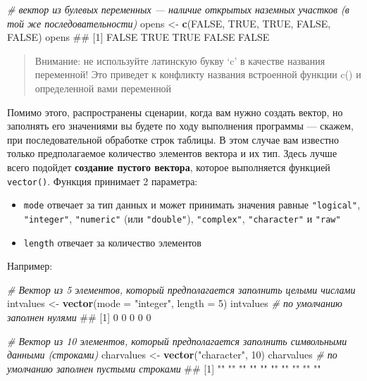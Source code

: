 \documentclass[]{book}
\newenvironment{Shaded}{\begin{snugshade}}{\end{snugshade}}
\newcommand{\KeywordTok}[1]{\textcolor[rgb]{0.13,0.29,0.53}{\textbf{#1}}}
\newcommand{\DataTypeTok}[1]{\textcolor[rgb]{0.13,0.29,0.53}{#1}}
\newcommand{\DecValTok}[1]{\textcolor[rgb]{0.00,0.00,0.81}{#1}}
\newcommand{\StringTok}[1]{\textcolor[rgb]{0.31,0.60,0.02}{#1}}
\newcommand{\CommentTok}[1]{\textcolor[rgb]{0.56,0.35,0.01}{\textit{#1}}}
\newcommand{\OtherTok}[1]{\textcolor[rgb]{0.56,0.35,0.01}{#1}}
\newcommand{\NormalTok}[1]{#1}
\providecommand{\tightlist}{%
  \setlength{\itemsep}{0pt}\setlength{\parskip}{0pt}}
\begin{document}
\begin{Shaded}
\begin{Highlighting}[]
\CommentTok{# вектор из булевых переменных — наличие  открытых наземных участков (в той же последовательности)}
\NormalTok{opens <-}\StringTok{ }\KeywordTok{c}\NormalTok{(}\OtherTok{FALSE}\NormalTok{, }\OtherTok{TRUE}\NormalTok{, }\OtherTok{TRUE}\NormalTok{, }\OtherTok{FALSE}\NormalTok{, }\OtherTok{FALSE}\NormalTok{)}
\NormalTok{opens}
\NormalTok{## [1] FALSE  TRUE  TRUE FALSE FALSE}
\end{Highlighting}
\end{Shaded}

\begin{quote}
Внимание: не используйте латинскую букву `c' в качестве названия
переменной! Это приведет к конфликту названия встроенной функции c() и
определенной вами переменной
\end{quote}

Помимо этого, распространены сценарии, когда вам нужно создать вектор,
но заполнять его значениями вы будете по ходу выполнения программы ---
скажем, при последовательной обработке строк таблицы. В этом случае вам
известно только предполагаемое количество элементов вектора и их тип.
Здесь лучше всего подойдет \textbf{создание пустого вектора}, которое
выполняется функцией \texttt{vector()}. Функция принимает 2 параметра:

\begin{itemize}
\tightlist
\item
  \texttt{mode} отвечает за тип данных и может принимать значения равные
  \texttt{"logical"}, \texttt{"integer"}, \texttt{"numeric"} (или
  \texttt{"double"}), \texttt{"complex"}, \texttt{"character"} и
  \texttt{"raw"}
\item
  \texttt{length} отвечает за количество элементов
\end{itemize}

Например:

\begin{Shaded}
\begin{Highlighting}[]
\CommentTok{# Вектор из 5 элементов, который предполагается заполнить целыми числами}
\NormalTok{intvalues <-}\StringTok{ }\KeywordTok{vector}\NormalTok{(}\DataTypeTok{mode =} \StringTok{"integer"}\NormalTok{, }\DataTypeTok{length =} \DecValTok{5}\NormalTok{)}
\NormalTok{intvalues }\CommentTok{# по умолчанию заполнен нулями}
\NormalTok{## [1] 0 0 0 0 0}

\CommentTok{# Вектор из 10 элементов, который предполагается заполнить символьными данными (строками)}
\NormalTok{charvalues <-}\StringTok{ }\KeywordTok{vector}\NormalTok{(}\StringTok{"character"}\NormalTok{, }\DecValTok{10}\NormalTok{)}
\NormalTok{charvalues }\CommentTok{# по умолчанию заполнен пустыми строками}
\NormalTok{##  [1] "" "" "" "" "" "" "" "" "" ""}
\end{Highlighting}
\end{Shaded}
\end{document}
